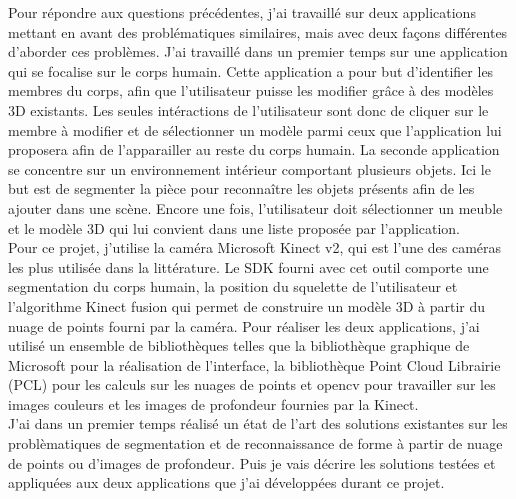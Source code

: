 Pour répondre aux questions précédentes, j'ai travaillé sur deux applications mettant en avant des problématiques similaires,
mais avec deux façons différentes d'aborder ces problèmes. J'ai travaillé dans un premier temps sur une application qui se focalise
sur le corps humain. Cette application a pour but d'identifier les membres du corps, afin que l'utilisateur puisse les modifier
grâce à des modèles 3D existants. Les seules intéractions de l'utilisateur sont donc de cliquer sur le membre à modifier et de sélectionner
un modèle parmi ceux que l'application lui proposera afin de l'apparailler au reste du corps humain. 
La seconde application se concentre sur un environnement intérieur comportant plusieurs
objets. Ici le but est de segmenter la pièce pour reconnaître les objets présents afin de les ajouter dans une scène. Encore une fois,
l'utilisateur doit sélectionner un meuble et le modèle 3D qui lui convient dans une liste proposée par l'application.\\

Pour ce projet, j'utilise la caméra Microsoft Kinect v2, qui est l'une des caméras les plus utilisée dans la littérature. Le SDK fourni
avec cet outil comporte une segmentation du corps humain, la position du squelette de l'utilisateur et l'algorithme Kinect fusion qui
permet de construire un modèle 3D à partir du nuage de points fourni par la caméra.
Pour réaliser les deux applications, j'ai utilisé un ensemble de bibliothèques telles que la bibliothèque graphique de Microsoft pour
la réalisation de l'interface, la bibliothèque \og Point Cloud Librairie \fg\cite{PCL}(PCL) pour les calculs sur les nuages de points et 
opencv pour travailler sur les images couleurs et les images de profondeur fournies par la Kinect.\\

J'ai dans un premier temps réalisé un état de l'art des solutions existantes sur les problèmatiques de segmentation et de reconnaissance de
forme à partir de nuage de points ou d'images de profondeur. Puis je vais décrire les solutions testées et appliquées aux deux applications que j'ai
développées durant ce projet.
